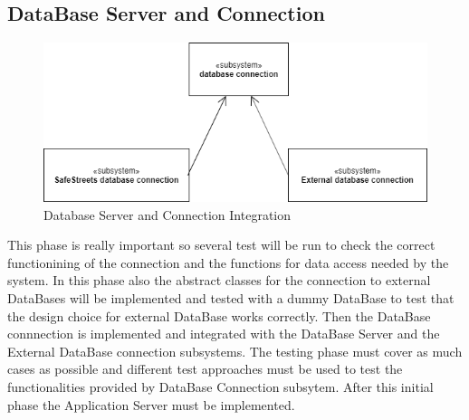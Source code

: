 \subsection{DataBase Server and Connection}
\begin{figure}[H]
\centering
\includegraphics[width=\textwidth]{Images/TestDBdiagram.png}
\caption{\label{fig:ComWI}Database Server and Connection Integration}
\end{figure}
This phase is really important so several test will be run to check the correct functionining of the connection and the functions for data access needed by the system. In this phase also the abstract classes for the connection to external DataBases will be implemented and tested with a dummy DataBase to test that the design choice for external DataBase works correctly. Then the DataBase connnection is implemented and integrated with the DataBase Server and the External DataBase connection subsystems.
The testing phase must cover as much cases as possible and different test approaches must be used to test the functionalities provided by DataBase Connection subsytem.
After this initial phase the Application Server must be implemented.
